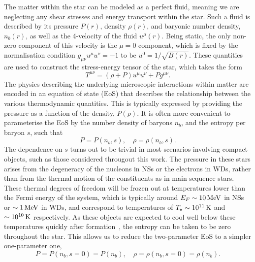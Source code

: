 The matter within the star can be modeled as a perfect fluid, meaning we are neglecting any shear stresses and energy transport within the star. Such a fluid is described by its pressure $P(r)$, density $\rho(r)$, and baryonic number density, $n_b(r)$, as well as the 4-velocity of the fluid $u^\mu(r)$. Being static, the only non-zero component of this velocity is the $\mu = 0$ component,
which is fixed by the normalisation condition $g_{\mu\nu}u^\mu u^\nu = -1$ to be $u^0 = 1/\sqrt{B(r)}$.
These quantities are used to construct the stress-energy tensor of the star, which takes the form
\begin{equation}
    T^{\mu\nu} = (\rho + P)u^\mu u^\nu + P g^{\mu\nu}.
\end{equation}
The physics describing the underlying microscopic interactions within matter are encoded in an equation of state (EoS) that describes the relationship between the various thermodynamic quantities. This is typically expressed by providing the pressure as a function of the density, $P(\rho)$. It is often more convenient to parameterise the EoS by the number density of baryons $n_b$, and the entropy per baryon $s$, such that
\begin{equation}
    P=P(n_b, s), \quad \rho = \rho(n_b, s).
\end{equation}
The dependence on $s$ turns out to be trivial in most scenarios involving compact objects, such as those considered througout this work. The pressure in these stars arises from the degeneracy of the nucleons in NSs or the electrons in WDs, rather than from the thermal motion of the constituents as in main sequence stars. These thermal degrees of freedom will be frozen out at temperatures lower than the Fermi energy of the system, which is typically around $E_F \sim 10{\rm \,MeV}$ in NSs or $\sim 1 {\rm \,MeV}$ in WDs, and correspond to temperatures of $T_\star\sim 10^{11}{\rm \,K}$ and $\sim 10^{10}{\rm \,K}$ respectively. As these objects are expected to cool well below these temperatures quickly after formation~\cite{Yakovlev:2004iq_Neutronstarcooling,Yakovlev:2004yr_Neutronstarcooling, Bedard_oct_Spectralevolutionhot}, the entropy can be taken to be zero throughout the star. This allows us to reduce the two-parameter EoS to a simpler one-parameter one,
\begin{equation}
    P=P(n_b, s = 0) = P(n_b), \quad \rho = \rho(n_b, s=0) = \rho(n_b).\label{ch2:eq:1_param_EoS}
\end{equation} 


